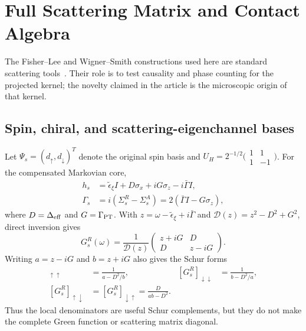 \documentclass[%
  aps,prb,reprint,amsmath,amssymb,superscriptaddress,longbibliography,floatfix
]{revtex4-2}
\newcommand{\teps}{\tilde{\epsilon}_{\xi}}
\begin{document}
\section{Full Scattering Matrix and Contact Algebra}
\label{app:Smatrix}

The Fisher--Lee and Wigner--Smith constructions used here are standard
scattering tools~\cite{fisherlee1981,wigner1955,smith1960}.  Their role is
to test causality and phase counting for the projected kernel; the novelty
claimed in the article is the microscopic origin of that kernel.

\subsection{Spin, chiral, and scattering-eigenchannel bases}

Let $\Psi_s=(d_\uparrow,d_\downarrow)^T$ denote the original spin basis and
$U_H=2^{-1/2}\bigl(\begin{smallmatrix}1&1\\1&-1\end{smallmatrix}\bigr)$.
For the compensated Markovian core,
\begin{align}
h_s&=\teps I+D\sigma_x+iG\sigma_z-i\bar\Gamma I,\nonumber\\
\Gamma_s&=i(\Sigma_s^R-\Sigma_s^A)
=2(\bar\Gamma I-G\sigma_z),
\label{eq:spin_kernel_rate}
\end{align}
where $D=\Delta_{\rm eff}$ and $G=\Gamma_{\rm PT}$.  With
$z=\omega-\teps+i\bar\Gamma$ and
$\mathcal D(z)=z^2-D^2+G^2$, direct inversion gives
\begin{equation}
G_s^R(\omega)=\frac{1}{\mathcal D(z)}
\begin{pmatrix}
z+iG&D\\ D&z-iG
\end{pmatrix}.
\label{eq:GR_spin_explicit}
\end{equation}
Writing $a=z-iG$ and $b=z+iG$ also gives the Schur forms
\begin{align}
[G_s^R]_{\uparrow\uparrow}
&=\frac{1}{a-D^2/b},&
[G_s^R]_{\downarrow\downarrow}
&=\frac{1}{b-D^2/a},\nonumber\\
[G_s^R]_{\uparrow\downarrow}
&=[G_s^R]_{\downarrow\uparrow}
=\frac{D}{ab-D^2}.
\label{eq:spin_schur_coefficients}
\end{align}
Thus the local denominators are useful Schur complements, but they do not
make the complete Green function or scattering matrix diagonal.
\end{document}

